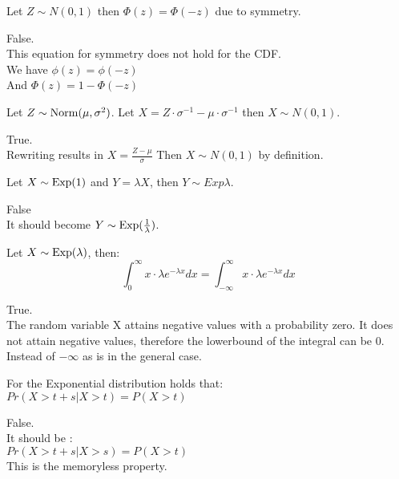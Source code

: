 \documentclass[tf-tutorial-all.tex]{subfiles}
\begin{document}
\begin{truefalse}
Let $Z \sim N(0,1)$ then $\Phi(z) = \Phi(-z)$ due to symmetry.
\begin{solution}
False.\\
This equation for symmetry does not hold for the CDF. \\
We have $\phi(z) = \phi(-z)$
\\And $\Phi(z) = 1 - \Phi(-z)$
\end{solution}
\end{truefalse}

\begin{truefalse}
Let $Z \sim \mathrm{Norm}(\mu, \sigma^{2})$. Let $X = Z \cdot \sigma^{-1} - \mu \cdot \sigma^{-1}$ then $X \sim N(0,1)$.
\begin{solution}
True.
\\Rewriting results in $X = \frac{Z - \mu}{\sigma} $ Then $ X \sim N(0,1)$ by definition.
\end{solution}
\end{truefalse}

\begin{truefalse}
Let $X \sim \mathrm{Exp}(1)$ and $Y = \lambda X$, then $Y \sim Exp{\lambda}$.
\begin{solution}
False\\
It should become $Y \sim \mathrm{Exp}(\frac{1}{\lambda})$.
\end{solution}
\end{truefalse}

\begin{truefalse}
Let $X \sim \mathrm{Exp}(\lambda)$, then:
\\$$ \int^{\infty}_{0} x \cdot \lambda e^{ - \lambda x} dx  =  \int^{\infty}_{- \infty} x \cdot \lambda e^{ - \lambda x} dx $$

\begin{solution}
True.\\
The random variable X  attains negative values with a probability zero. It does not attain negative values, therefore the lowerbound of the integral can be 0. Instead of $-\infty$ as is in the general case.

\end{solution}
\end{truefalse}

\begin{truefalse}
For the Exponential distribution holds that:
\\ $Pr(X > t + s | X > t) = P(X > t)$

\begin{solution}
 False.
 \\It should be :
\\ $Pr(X > t + s | X > s) = P(X > t)$
\\This is the memoryless property.
\end{solution}
\end{truefalse}
\end{document}
